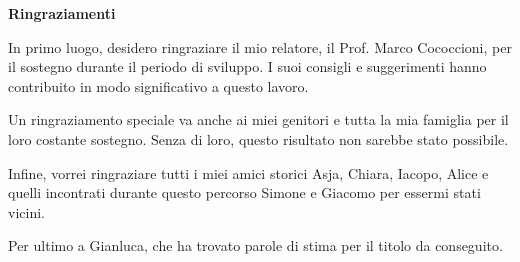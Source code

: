 \thispagestyle{empty}

\begin{center}
\textbf{\LARGE Ringraziamenti}
\end{center}

In primo luogo, desidero ringraziare il mio relatore, il Prof. Marco Cococcioni, per il sostegno durante il periodo di sviluppo. I suoi consigli e suggerimenti hanno contribuito in modo significativo a questo lavoro.\par
Un ringraziamento speciale va anche ai miei genitori e tutta la mia famiglia per il loro costante sostegno. Senza di loro, questo risultato non sarebbe stato possibile.\par
Infine, vorrei ringraziare tutti i miei amici storici Asja, Chiara, Iacopo, Alice e quelli incontrati durante questo percorso Simone e Giacomo per essermi stati vicini.\par
Per ultimo a Gianluca, che ha trovato parole di stima per il titolo da conseguito.